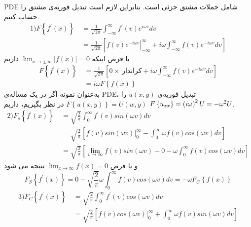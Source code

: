 PDE
شامل جملات مشتق جزئی است. بنابراین لازم است تبدیل فوریه‌ی مشتق را حساب کنیم.
\begin{equation*}
	\begin{aligned}
		1) F\left\{f^\prime(x)\right\} {}&\ =
		\frac{1}{\sqrt{2\pi}}\int_{-\infty}^\infty
		f^\prime(v)e^{i\omega v}dv
		\\ &\
		= \frac1{\sqrt{2\pi}}\left[
		\left.{f(v)e^{-i\omega v}}\right|_{-\infty}^\infty
		+i\omega \int_{-\infty}^\infty f(v)e^{-i\omega v}dv
		\right]
	\end{aligned}
\end{equation*}
با فرض اینکه
$\lim_{x\to\pm\infty}\left|f(x)\right|=0$
داریم
\begin{equation*}
	\begin{aligned}
		F\left\{
		f^\prime(x)
		\right\}{}&\
		=\frac1{\sqrt{2\pi}}\left[
		0\times\ \text{کراندار}+i\omega\int_{-\infty}^\infty f(v)e^{-i\omega v}dv
		\right]
		\\ &\
		=i\omega F\left\{f(x)\right\}
	\end{aligned}
\end{equation*}
به‌عنوان نمونه اگر در یک مساله‌ی PDE، تبدیل فوریه‌ی
$u(x,y)$
را
$F\left\{u(x,y)\right\}=U(w,y)$
در نظر بگیریم، داریم
$F\left\{u_{xx}\right\}=\left(i\omega\right)^2U=-\omega^2U$.
\begin{equation*}
	\begin{aligned}
		2) F_s\left\{f^\prime(x)\right\} {} &\ =\sqrt{\frac2\pi}\int_0^\infty f^\prime(v)sin(\omega v)dv
		\\ &\
		= \sqrt{\frac2\pi}\left[
		\left.{f(v)sin(\omega v)}\right|_0^\infty-\int_0^\infty \omega f(v)cos(\omega v)dv
		\right]
		\\ &\
		= \sqrt{\frac2\pi}\left[
		\lim_{v\to\infty}f(v)sin(\omega v) -0
		-\omega\int_0^\infty f(v)cos(\omega v)dv
		\right]
	\end{aligned}
\end{equation*}
و با فرض
$\lim_{x\to\infty}f(x)=0$
نتیجه می شود
\[
F_S\left\{f^\prime(x)\right\}=0-\sqrt{\frac2\pi}\omega\int_0^\infty f(v)cos(\omega v)dv=-\omega F_C\left\{f(x)\right\}
\]
\begin{equation*}
	\begin{aligned}
		3) F_C\left\{f^\prime(x)\right\}&\ =\sqrt{\frac2\pi}\int_0^\infty f^\prime(v)cos(\omega v)dv
		\\ &\
		= \sqrt{\frac2\pi}\left[
		\left.{f(v)cos(\omega v)}\right|_0^\infty+\int_0^\infty \omega f(v)sin(\omega v)dv
		\right]
	\end{aligned}
\end{equation*}

